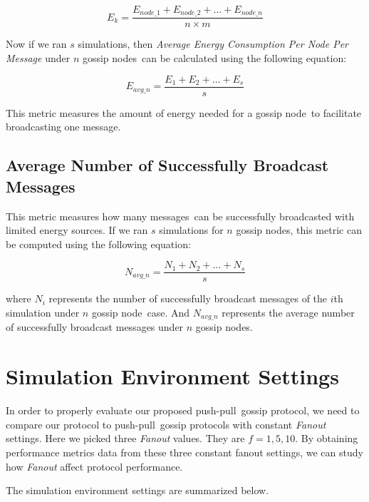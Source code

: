 \documentclass[onehalf,11pt]{beavtex}
\newcommand{\gp}{gossip protocol}
\newcommand{\msgs}{messages}
\newcommand{\msg}{message}
\newcommand{\pp}{push-pull}
\newcommand{\gn}{gossip node}
\newcommand{\gns}{gossip nodes}
\begin{document}
\[ E_k = \frac{E_{node\_1} + E_{node\_2} + \ldots + E_{node\_n}}{n\times m} \]

Now if we ran $s$ simulations, then \emph{Average Energy Consumption Per Node Per Message} under $n$ \gns ~can be calculated using the following equation:

\[ E_{avg\_n} = \frac{E_1 + E_2 + \ldots + E_s}{s} \]

This metric measures the amount of energy needed for a \gn ~to facilitate broadcasting one \msg. 

\subsection{Average Number of Successfully Broadcast Messages}

This metric measures how many \msgs ~can be successfully broadcasted with limited energy sources. If we ran $s$ simulations for $n$ \gns, this metric can be computed using the following equation:

\[ N_{avg\_n} = \frac{N_1 + N_2 + \dots + N_s}{s} \]

where $N_i$ represents the number of successfully broadcast messages of the $i$th simulation under $n$ \gn ~case. And $N_{avg\_n}$ represents the average number of successfully broadcast messages under $n$ \gns. 

\section{Simulation Environment Settings}

In order to properly evaluate our proposed \pp ~\gp, we need to compare our protocol to \pp ~gossip protocols with constant \emph{Fanout} settings. Here we picked three \emph{Fanout} values. They are $f=1, 5, 10$. By obtaining performance metrics data from these three constant fanout settings, we can study how \emph{Fanout} affect protocol performance. 

The simulation environment settings are summarized below.
\end{document}
